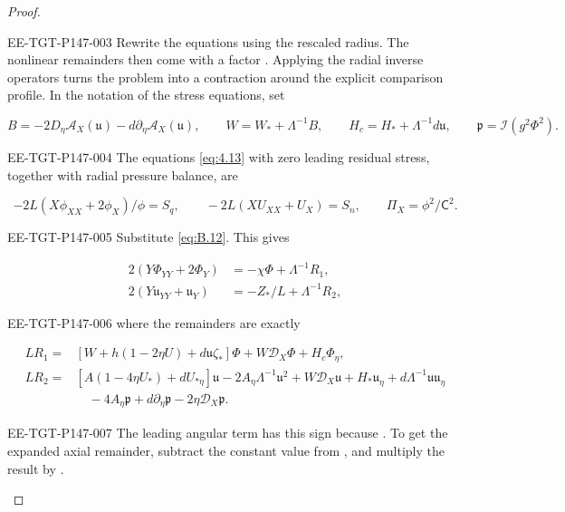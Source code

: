 \begin{proof}
\begin{EESegment}{EE-TGT-P147-003}
Rewrite the equations using the rescaled radius. The nonlinear remainders then come with a factor
. Applying the radial inverse operators turns the problem into a
contraction around the explicit comparison profile. In the notation of the stress equations, set
\end{EESegment}
\begin{equation}
  B=-2D_\eta\mathcal A_X(\mathfrak u)-d\partial_\eta\mathcal A_X(\mathfrak u),
  \qquad W=W_*+\Lambda^{-1}B,
  \qquad H_c=H_*+\Lambda^{-1}d\mathfrak u,
  \qquad \mathfrak p=\mathcal I(g^2\Phi^2).
  \tag{B.14}\label{eq:B.14}
\end{equation}
\begin{EESegment}{EE-TGT-P147-004}
The equations \eqref{eq:4.13} with zero leading residual stress, together with radial pressure
balance, are
\end{EESegment}
\begin{equation}
  -2L(X\phi_{XX}+2\phi_X)/\phi=S_q,
  \qquad -2L(XU_{XX}+U_X)=S_n,
  \qquad \Pi_X=\phi^2/\mathsf C^2.
  \tag{B.15}\label{eq:B.15}
\end{equation}
\begin{EESegment}{EE-TGT-P147-005}
Substitute \eqref{eq:B.12}. This gives
\end{EESegment}
\begin{align*}
  2(Y\Phi_{YY}+2\Phi_Y)&=-\chi\Phi+\Lambda^{-1}R_1,\\
  2(Y\mathfrak u_{YY}+\mathfrak u_Y)&=-Z_*/L+\Lambda^{-1}R_2,
\end{align*}
\begin{EESegment}{EE-TGT-P147-006}
where the remainders are exactly
\end{EESegment}
\begin{align*}
  LR_1={}&[W+h(1-2\eta U)+d\mathfrak u\zeta_*]\Phi+W\mathcal D_X\Phi+H_c\Phi_\eta,\\
  LR_2={}&[A(1-4\eta U_*)+dU_{*\eta}]\mathfrak u-2A_\eta\Lambda^{-1}\mathfrak u^2
            +W\mathcal D_X\mathfrak u+H_*\mathfrak u_\eta+d\Lambda^{-1}\mathfrak u\mathfrak u_\eta\\
          &\quad-4A_\eta\mathfrak p+d\partial_\eta\mathfrak p-2\eta\mathcal D_X\mathfrak p.
\end{align*}
\begin{EESegment}{EE-TGT-P147-007}
The leading angular term has this sign because
. To get the expanded axial remainder,
subtract the constant value  from
,
and multiply the result by .
\end{EESegment}


\end{proof}
